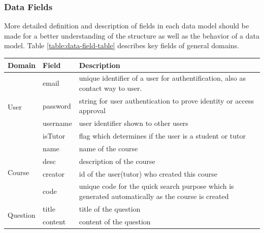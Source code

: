 \subsubsection{ Data Fields }

More detailed definition and description of fields in each data model should be made for a better understanding of the structure as well as the behavior of a data model. Table \ref{table:data-field-table} describes key fields of general domains.


\begin{table}[]
\centering
\begin{tabularx}{\textwidth}{@{}llX@{}}
\toprule
Domain                    & Field           & Description                                                                                    \\ \midrule
\multirow{4}{*}{User}     & email           & unique identifier of a user for authentification, also as contact way to user.                \\
                          & password        & string for user authentication to prove identity or access approval                            \\
                          & username        & user identifier shown to other users                                                           \\
                          & isTutor         & flag which determines if the user is a student or tutor                                        \\ \midrule
\multirow{4}{*}{Course}   & name            & name of the course                                                                             \\
                          & desc            & description of the course                                                                      \\
                          & creator         & id of the user(tutor) who created this course                                                  \\
                          & code            & unique code for the quick search purpose which is generated automatically as the course is created \\ \midrule
\multirow{5}{*}{Question} & title           & title of the question                                                                          \\
                          & content         & content of the question                                                                        \\

\end{tabularx}
\end{table}
